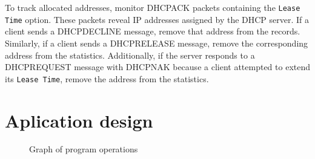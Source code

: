 \documentclass[a4paper, 11pt, a4paper]{article}
\begin{document}
To track allocated addresses, monitor DHCPACK packets containing the \texttt{Lease Time} option. These packets reveal IP addresses assigned by the DHCP server. 
If a client sends a DHCPDECLINE message, remove that address from the records. Similarly, if a client sends a DHCPRELEASE message, remove the corresponding
address from the statistics. Additionally, if the server responds to a DHCPREQUEST message with DHCPNAK because a client attempted to extend its \texttt{Lease Time},
remove the address from the statistics.



\section{Aplication design}
\label{section:design}

\begin{figure}[ht]
    \begin{center}
    \end{center}
    \caption{Graph of program operations}
    \label{figure:dhcp-stats-design}
\end{figure}
\end{document}

